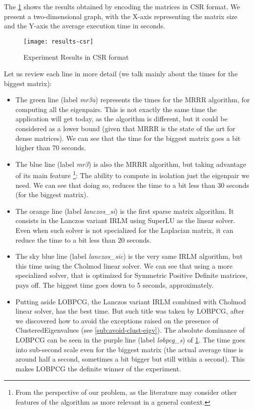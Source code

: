 The \cref{fig:exper-csr} shows the results
obtained by encoding the matrices in CSR format. We present a
two-dimensional graph, with the X-axis representing the matrix size
and the Y-axis the average execution time in seconds. 

\begin{figure}[H]
  \centering
  \caption{Experiment Results in CSR format}
  \label{fig:exper-csr}  
  \texttt{[image: results-csr]}
\end{figure}

Let us review each line in more detail (we talk mainly about the times
for the biggest matrix):

\begin{itemize}
\item The green line (label \emph{mr3a}) represents the times for the
  \gls{MRRR} algorithm, for 
  computing all the eigenpairs. This is not exactly the same time
  the application will get today, as the algorithm is different, but
  it could be considered as a lower bound (given that \gls{MRRR} is the
  state of the art for dense matrices). We can see that the time for
  the biggest matrix goes a bit higher than 70 seconds.
\item The blue line (label \emph{mr3}) is also the \gls{MRRR} algorithm, but
  taking advantage of its main feature \footnote{From the perspective
    of our problem, as the literature may consider other features of
    the algorithm as more relevant in a general context.}: The
  ability to compute in 
  isolation just the eigenpair we need. We can see that doing so,
  reduces the time to a bit less than 30 seconds (for the biggest
  matrix).
\item The orange line (label \emph{lanczos\_si}) is the first sparse
  matrix algorithm. It consists in the Lanczos variant \gls{IRLM}
  using \gls{SuperLU} 
  as the linear solver. Even when such solver is not specialized for
  the \gls{Laplacian} matrix, it can reduce the time to a bit less than 20
  seconds.
  \item The sky blue line (label \emph{lanczos\_sic}) is the very same
    \gls{IRLM} algorithm, but this time using the \gls{Cholmod} linear solver. We
    can see that using a more specialized solver, that is optimized
    for Symmetric Positive Definite matrices, pays off. The biggest
    time goes down to 5 seconds, approximately.
  \item Putting aside \gls{LOBPCG}, the Lanczos variant \gls{IRLM}
    combined with \gls{Cholmod} linear solver, has the best time. But
    such title was taken by \gls{LOBPCG}, after we discovered how to
    avoid the exceptions raised on the presence of
    \gls{ClusteredEigenvalues} (see \cref{sub:avoid-clust-eigv}). The
    absolute dominance of \gls{LOBPCG} can be seen in the  
    purple  line (label \emph{lobpcg\_s}) of \cref{fig:exper-csr}. The time 
    goes into sub-second scale even for the biggest matrix (the actual
    average time is around half a second, sometimes a bit bigger but
    still within a second). This makes \gls{LOBPCG} the definite winner of
    the experiment. 
\end{itemize}

